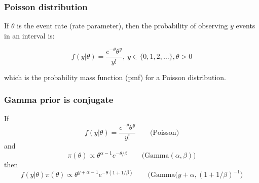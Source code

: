 \documentclass{beamer}
\newcommand{\1}{\ensuremath{\mathbf{1}}}
\begin{document}
%
%
%
\begin{frame}\frametitle{Poisson distribution}
	If $\theta$ is the event rate (rate parameter), then the probability of observing $y$ events in an interval is:
	\begin{block}{}
	\begin{equation}
		f(y|\theta) = \frac{e^{-\theta}\theta^y}{y!}, \: y \in \{0,1,2,\ldots\}, \theta > 0
	\end{equation}
	\end{block}
	which is the probability mass function (pmf) for a Poisson distribution.
\end{frame}
%
%
%
\begin{frame}\frametitle{Gamma prior is conjugate}
	If
	\begin{equation}
		f(y|\theta) = \frac{e^{-\theta}\theta^y}{y!} \qquad \text{(Poisson)}
	\end{equation}
	and
	\begin{equation}
		\pi(\theta) \propto \theta^{\alpha-1}e^{-\theta/\beta} \qquad \text{(Gamma$(\alpha,\beta)$)}
	\end{equation}
	then
	\begin{equation}
		f(y|\theta) \pi(\theta) \propto \theta^{y+\alpha-1}e^{-\theta(1+1/\beta)} \qquad \text{(Gamma$(y+\alpha,(1+1/\beta)^{-1}$)}
	\end{equation}
\end{frame}
%
%
%
\end{document}
